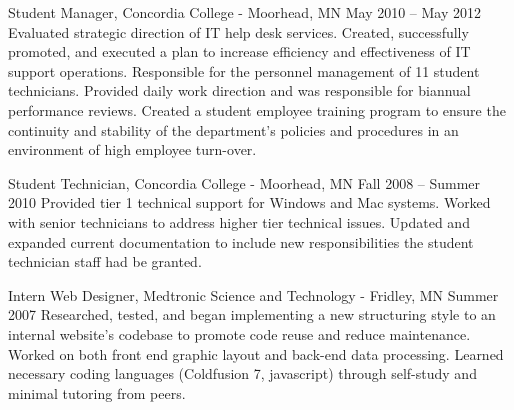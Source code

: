 Student Manager, Concordia College - Moorhead, MN
May 2010 – May 2012
Evaluated strategic direction of IT help desk services.  Created, successfully promoted, and executed a plan to increase efficiency and effectiveness of IT support operations.
Responsible for the personnel management of 11 student technicians.  Provided daily work direction and was responsible for biannual performance reviews.
Created a student employee training program to ensure the continuity and stability of the department’s policies and procedures in an environment of high employee turn-over.

Student Technician, Concordia College - Moorhead, MN
Fall 2008 – Summer 2010
Provided tier 1 technical support for Windows and Mac systems.
Worked with senior technicians to address higher tier technical issues.
Updated and expanded current documentation to include new responsibilities the student technician staff had be granted.

Intern Web Designer, Medtronic Science and Technology - Fridley, MN
Summer 2007
Researched, tested, and began implementing a new structuring style to an internal website’s codebase to promote code reuse and reduce maintenance.
Worked on both front end graphic layout and back-end data processing.
Learned necessary coding languages (Coldfusion 7, javascript) through self-study and minimal tutoring from peers.